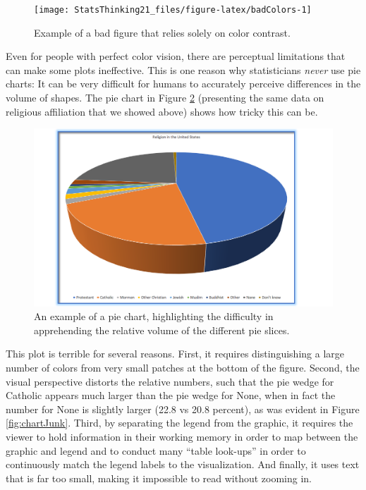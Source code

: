 \documentclass[
  12pt,
]{book}
\begin{document}
\begin{figure}
\texttt{[image: StatsThinking21\_files/figure-latex/badColors-1]} \caption{Example of a bad figure that relies solely on color contrast.}\label{fig:badColors}
\end{figure}

Even for people with perfect color vision, there are perceptual limitations that can make some plots ineffective. This is one reason why statisticians \emph{never} use pie charts: It can be very difficult for humans to accurately perceive differences in the volume of shapes. The pie chart in Figure \ref{fig:pieChart} (presenting the same data on religious affiliation that we showed above) shows how tricky this can be.

\begin{figure}
\includegraphics[width=14.11in,height=0.5\textheight]{images/religion_piechart} \caption{An example of a pie chart, highlighting the difficulty in apprehending the relative volume of the different pie slices.}\label{fig:pieChart}
\end{figure}

This plot is terrible for several reasons. First, it requires distinguishing a large number of colors from very small patches at the bottom of the figure. Second, the visual perspective distorts the relative numbers, such that the pie wedge for Catholic appears much larger than the pie wedge for None, when in fact the number for None is slightly larger (22.8 vs 20.8 percent), as was evident in Figure \ref{fig:chartJunk}. Third, by separating the legend from the graphic, it requires the viewer to hold information in their working memory in order to map between the graphic and legend and to conduct many ``table look-ups'' in order to continuously match the legend labels to the visualization. And finally, it uses text that is far too small, making it impossible to read without zooming in.
\end{document}
